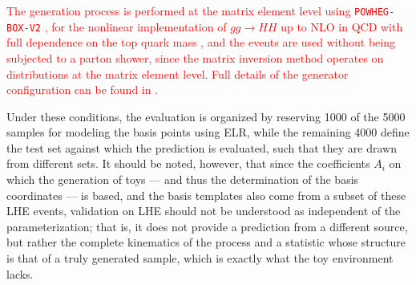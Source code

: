 \textcolor{red}{
The generation process is performed at the matrix element level using \texttt{POWHEG-BOX-V2} \cite{powheg1,powheg2,powheg3}, for the nonlinear implementation of $gg\to HH$ up to NLO in QCD with full dependence on the top quark mass \cite{HEFTpowheg}, and the events are used without being subjected to a parton shower, since the matrix inversion method operates on distributions at the matrix element level. Full details of the generator configuration can be found in \cite{HHReweighting}.}

Under these conditions, the evaluation is organized by reserving 1000 of the 5000 samples for modeling the basis points using ELR, while the remaining 4000 define the test set against which the prediction is evaluated, such that they are drawn from different sets. It should be noted, however, that since the coefficients $A_i$ on which the generation of toys — and thus the determination of the basis coordinates — is based, and the basis templates also come from a subset of these LHE events, validation on LHE should not be understood as independent of the parameterization; that is, it does not provide a prediction from a different source, but rather the complete kinematics of the process and a statistic whose structure is that of a truly generated sample, which is exactly what the toy environment lacks.\medskip



